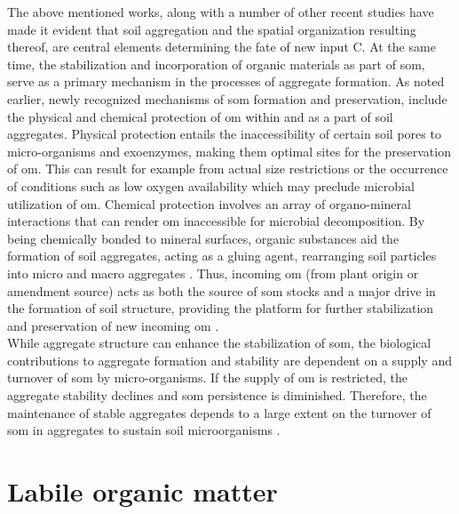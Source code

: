 \documentclass[12pt]{report}
\begin{document}
		The above mentioned works, along with a  number of other recent studies have made it evident that soil aggregation and the spatial organization resulting thereof, are central elements determining the fate of new input C. At the same time, the stabilization and incorporation of organic materials as part of \gls{som}, serve as a primary mechanism in the processes of aggregate formation. As noted earlier, newly recognized mechanisms of \gls{som} formation and preservation, include the physical and chemical protection of \gls{om} within and as a part of soil aggregates. Physical protection entails the inaccessibility of certain soil pores to micro-organisms and exoenzymes, making them optimal sites for the preservation of \gls{om}. This can result for example from actual size restrictions or the occurrence of conditions such as low oxygen availability which may preclude microbial utilization of \gls{om}. Chemical protection involves an array of organo-mineral interactions that can render \gls{om} inaccessible for microbial decomposition. By being chemically bonded to mineral surfaces, organic substances aid the formation of soil aggregates, acting as a gluing agent, rearranging soil particles into micro and macro aggregates \citep{six2002}. Thus, incoming \gls{om} (from plant origin or amendment source) acts as both the source of \gls{som} stocks and a major drive in the formation of soil structure, providing the platform for further stabilization and preservation of new incoming \gls{om} \citep{mccarthy2008}.\\
		While aggregate structure can enhance the stabilization of \gls{som}, the biological contributions to aggregate formation and stability are dependent on a supply and turnover of \gls{som} by micro-organisms. If the supply of \gls{om} is restricted, the aggregate stability declines and \gls{som} persistence is diminished. Therefore, the maintenance of stable aggregates  depends to a large extent on the turnover of \gls{som} in aggregates to sustain soil microorganisms \citep{dungait2012, golchin1994}.
		
		\section{Labile organic matter}
		
\end{document}
